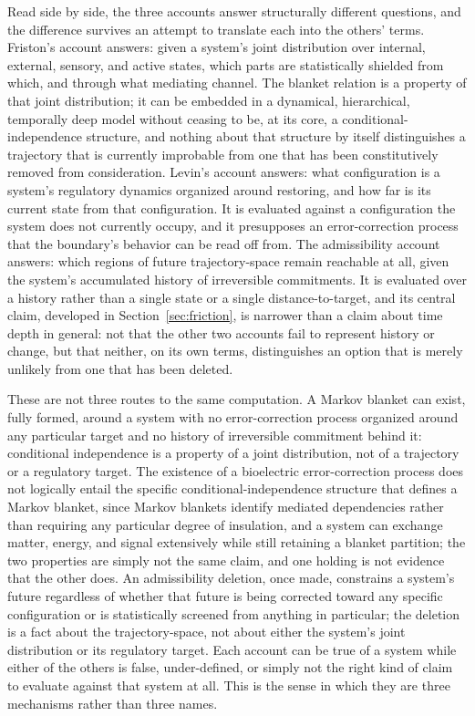 \documentclass[11pt]{article}
\theoremstyle{plain}
\begin{document}
Read side by side, the three accounts answer structurally different questions, and the difference survives an attempt to translate each into the others' terms. Friston's account answers: given a system's joint distribution over internal, external, sensory, and active states, which parts are statistically shielded from which, and through what mediating channel. The blanket relation is a property of that joint distribution; it can be embedded in a dynamical, hierarchical, temporally deep model without ceasing to be, at its core, a conditional-independence structure, and nothing about that structure by itself distinguishes a trajectory that is currently improbable from one that has been constitutively removed from consideration. Levin's account answers: what configuration is a system's regulatory dynamics organized around restoring, and how far is its current state from that configuration. It is evaluated against a configuration the system does not currently occupy, and it presupposes an error-correction process that the boundary's behavior can be read off from. The admissibility account answers: which regions of future trajectory-space remain reachable at all, given the system's accumulated history of irreversible commitments. It is evaluated over a history rather than a single state or a single distance-to-target, and its central claim, developed in Section~\ref{sec:friction}, is narrower than a claim about time depth in general: not that the other two accounts fail to represent history or change, but that neither, on its own terms, distinguishes an option that is merely unlikely from one that has been deleted.

These are not three routes to the same computation. A Markov blanket can exist, fully formed, around a system with no error-correction process organized around any particular target and no history of irreversible commitment behind it: conditional independence is a property of a joint distribution, not of a trajectory or a regulatory target. The existence of a bioelectric error-correction process does not logically entail the specific conditional-independence structure that defines a Markov blanket, since Markov blankets identify mediated dependencies rather than requiring any particular degree of insulation, and a system can exchange matter, energy, and signal extensively while still retaining a blanket partition; the two properties are simply not the same claim, and one holding is not evidence that the other does. An admissibility deletion, once made, constrains a system's future regardless of whether that future is being corrected toward any specific configuration or is statistically screened from anything in particular; the deletion is a fact about the trajectory-space, not about either the system's joint distribution or its regulatory target. Each account can be true of a system while either of the others is false, under-defined, or simply not the right kind of claim to evaluate against that system at all. This is the sense in which they are three mechanisms rather than three names.
\end{document}
